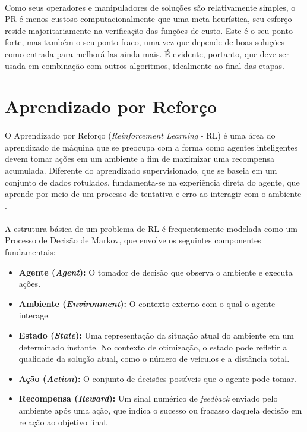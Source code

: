 \paragraph{} Como seus operadores e manipuladores de soluções são relativamente simples, o PR é menos custoso computacionalmente que uma meta-heurística, seu esforço reside majoritariamente na verificação das funções de custo. Este é o seu ponto forte, mas também o seu ponto fraco, uma vez que depende de boas soluções como entrada para melhorá-las ainda mais. É evidente, portanto, que deve ser usada em combinação com outros algoritmos, idealmente ao final das etapas.

\section{Aprendizado por Reforço}
\label{sec:rl}

\paragraph{} O Aprendizado por Reforço (\textit{Reinforcement Learning} - RL) é uma área do aprendizado de máquina que se preocupa com a forma como agentes inteligentes devem tomar ações em um ambiente a fim de maximizar uma recompensa acumulada. Diferente do aprendizado supervisionado, que se baseia em um conjunto de dados rotulados, fundamenta-se na experiência direta do agente, que aprende por meio de um processo de tentativa e erro ao interagir com o ambiente \cite{Sutton18}.

\paragraph{} A estrutura básica de um problema de RL é frequentemente modelada como um Processo de Decisão de Markov, que envolve os seguintes componentes fundamentais:

\begin{itemize}
    \item \textbf{Agente (\textit{Agent}):} O tomador de decisão que observa o ambiente e executa ações.
    \item \textbf{Ambiente (\textit{Environment}):} O contexto externo com o qual o agente interage.
    \item \textbf{Estado (\textit{State}):} Uma representação da situação atual do ambiente em um determinado instante. No contexto de otimização, o estado pode refletir a qualidade da solução atual, como o número de veículos e a distância total.
    \item \textbf{Ação (\textit{Action}):} O conjunto de decisões possíveis que o agente pode tomar.
    \item \textbf{Recompensa (\textit{Reward}):} Um sinal numérico de \textit{feedback} enviado pelo ambiente após uma ação, que indica o sucesso ou fracasso daquela decisão em relação ao objetivo final.
\end{itemize}

